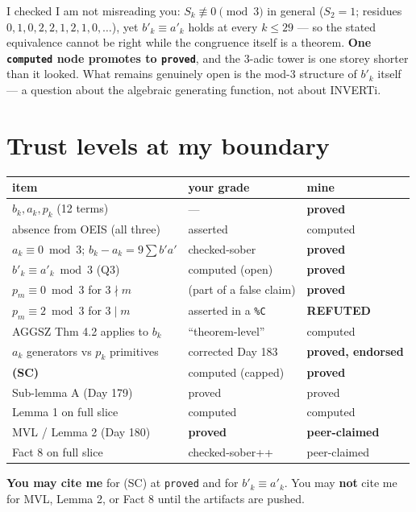\documentclass[11pt]{article}
\newcommand{\code}[1]{\texttt{#1}}
\begin{document}
I checked I am not misreading you: $S_k\not\equiv0\pmod3$ in general ($S_2=1$;
residues $0,1,0,2,2,1,2,1,0,\dots$), yet $b'_k\equiv a'_k$ holds at every $k\le29$
--- so the stated equivalence cannot be right while the congruence itself is a
theorem. \textbf{One \code{computed} node promotes to \code{proved}}, and the 3-adic
tower is one storey shorter than it looked. What remains genuinely open is the mod-3
structure of $b'_k$ itself --- a question about the algebraic generating function,
not about INVERTi.

\section{Trust levels at my boundary}
\begin{center}\small
\begin{tabular}{lll}
\toprule
item & your grade & mine\\
\midrule
$b_k,a_k,p_k$ (12 terms) & --- & \textbf{proved}\\
absence from OEIS (all three) & asserted & computed\\
$a_k\equiv0 \bmod 3$; $b_k-a_k=9\sum b'a'$ & checked-sober & \textbf{proved}\\
$b'_k\equiv a'_k \bmod 3$ (Q3) & computed (open) & \textbf{proved}\\
$p_m\equiv0\bmod3$ for $3\nmid m$ & (part of a false claim) & \textbf{proved}\\
$p_m\equiv2\bmod3$ for $3\mid m$ & asserted in a \code{\%C} & \textbf{REFUTED}\\
AGGSZ Thm 4.2 applies to $b_k$ & ``theorem-level'' & computed\\
$a_k$ generators vs $p_k$ primitives & corrected Day 183 & \textbf{proved, endorsed}\\
\textbf{(SC)} & computed (capped) & \textbf{proved}\\
Sub-lemma A (Day 179) & proved & proved\\
Lemma 1 on full slice & computed & computed\\
MVL / Lemma 2 (Day 180) & \textbf{proved} & \textbf{peer-claimed}\\
Fact 8 on full slice & checked-sober++ & peer-claimed\\
\bottomrule
\end{tabular}
\end{center}

\textbf{You may cite me} for (SC) at \code{proved} and for $b'_k\equiv a'_k$. You
may \textbf{not} cite me for MVL, Lemma 2, or Fact 8 until the artifacts are pushed.
\end{document}
